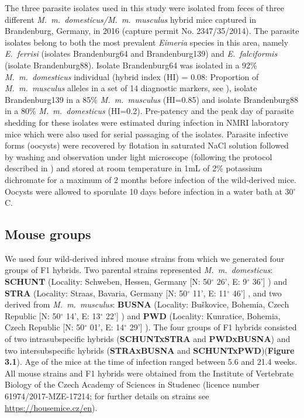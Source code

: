The three parasite isolates used in this study were isolated from feces of three different \textit{M.~m.~domesticus/M.~m.~musculus} hybrid mice captured in Brandenburg, Germany, in 2016 (capture permit No. 2347/35/2014). The parasite isolates belong to both the most prevalent \textit{Eimeria }species in this area, namely \textit{E.~ferrisi }(isolates Brandenburg64 and Brandenburg139) and \textit{E.~falciformis }(isolate Brandenburg88)\citep{jarquin-diaz_detection_2019}. Isolate Brandenburg64 was isolated in a 92\% \textit{M.~m.~domesticus} individual (hybrid index (HI) = 0.08: Proportion of \textit{M.~m.~musculus} alleles in a set of 14 diagnostic markers, see \cite{Balard2020}), isolate Brandenburg139 in a 85\% \textit{M.~m.~musculus} (HI=0.85) and isolate Brandenburg88 in a 80\% \textit{M.~m.~domesticus} (HI=0.2). Pre-patency and the peak day of parasite shedding for these isolates were estimated during infection in NMRI laboratory mice \citep{al-khlifeh_eimeria_2019} which were also used for serial passaging of the isolates. Parasite infective forms (oocysts) were recovered by flotation in saturated NaCl solution followed by washing and observation under light microscope (following the protocol described in \cite{clerc_parasitic_2019}) and stored at room temperature in 1mL of 2\% potassium dichromate for a maximum of 2 months before infection of the wild-derived mice. Oocysts were allowed to sporulate 10 days before infection in a water bath at 30$^{\circ}$C.\par

\subsection{Mouse groups}

We used four wild-derived inbred mouse strains from which we generated four groups of F1 hybrids. Two parental strains represented \textit{M.~m.~domesticus}: \textbf{SCHUNT} (Locality: Schweben, Hessen, Germany [N: 50$ ^{\circ} $ 26’, E: 9$ ^{\circ} $ 36’] \citep{martincova_phenotypic_2019}) and \textbf{STRA} (Locality: Straas, Bavaria, Germany [N: 50$ ^{\circ} $ 11’, E: 11$ ^{\circ} $ 46’] \citep{pialek_development_2008}, and two derived from \textit{M.~m.~musculus}: \textbf{BUSNA} (Locality: Buškovice, Bohemia, Czech Republic [N: 50$ ^{\circ} $ 14’, E: 13$ ^{\circ} $ 22’] \citep{pialek_development_2008}) and \textbf{PWD} (Locality: Kunratice, Bohemia, Czech Republic [N: 50$ ^{\circ} $ 01’, E: 14$ ^{\circ} $ 29’] \citep{gregorova_pwdph_2000}). The four groups of F1 hybrids consisted of two intrasubspecific hybrids (\textbf{SCHUNTxSTRA }and \textbf{PWDxBUSNA}) and two intersubspecific hybrids (\textbf{STRAxBUSNA} and \textbf{SCHUNTxPWD})(\textbf{Figure 3.1}). Age of the mice at the time of infection ranged between 5.6 and 21.4 weeks. All mouse strains and F1 hybrids were obtained from the Institute of Vertebrate Biology of the Czech Academy of Sciences in Studenec (licence number 61974/2017-MZE-17214; for further details on strains see \url{https://housemice.cz/en}).\par

